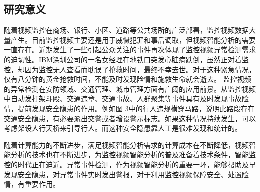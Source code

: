 \subsection{研究意义}
    随着视频监控在商场、银行、小区、道路等公共场所的广泛部署，监控视频数据大量产生。目前监控视频主要还是用于威慑犯罪和事后调取，但视频智能分析的需要一直存在。近期发生了一些引起公众关注的事件再次体现了监控视频异常检测需求的迫切性。IBM深圳公司的一名女经理在地铁口突发心脏病跌倒，虽然正对着监控，却因为监控无人查看而耽误了抢救时间，最终不幸去世。对于这种紧急情况，仅有八分钟的黄金抢救时间，不能及时发现险情和施救生命就会逝去。
    监控视频的异常检测在安防领域、交通管理、城市管理方面有广阔的应用前景。从监控视频中自动发打架斗殴、交通违章、交通事故、人群聚集等事件具有及时发现事故险情，提前发现安全隐患的作用。例如图 3中的行人违规横穿马路，说明此路段存在交通安全隐患，有必要派出交警或者增设警示标志。如果这种情况持续发生，可以考虑架设人行天桥来引导行人。而这种安全隐患靠人工是很难发现和统计的。

  随着计算能力的不断进步，满足视频智能分析需求的计算成本在不断降低，视频智能分析的技术也在不断进步，为监控视频智能分析的普及准备着技术条件，智能监控的时代正在迫近。异常事件检测，作为视频智能分析的重要一环，能够帮助及早发现安全隐患，对异常事件实时发出警报，对于利用监控视频保障安全、处置险情，有重要作用。


